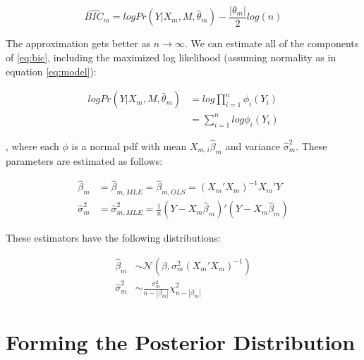 \documentclass{article}
\begin{document}
	\begin{equation} \label{eq:bic}
		\hat{BIC}_m = logPr(Y|X_m,M,\hat{\theta}_m) - \frac{|\theta_m|}{2}log(n)
	\end{equation}

	\noindent The approximation gets better as $n \rightarrow \infty$.  We can estimate all of the
	components of \eqref{eq:bic}, including the maximized log likelihood (assuming normality as 
	in equation \eqref{eq:model}):

	\begin{equation}
		\begin{aligned}
			logPr(Y|X_m,M,\hat{\theta}_m) & = log\prod_{i=1}^n \phi_i(Y_i) \\
			                              & = \sum_{i=1}^n log\phi_i(Y_i)
		\end{aligned}
	\end{equation}

	\noindent, where each $\phi$ is a normal pdf with mean $X_{m,i}\hat{\beta}_m$ and 
	variance $\hat{\sigma}_m^2$. These parameters are estimated as follows:

	\begin{equation}
		\begin{aligned}
			\hat{\beta}_m & = \hat{\beta}_{m,MLE} = \hat{\beta}_{m,OLS} = (X_m'X_m)^{-1}X_m'Y \\
			\hat{\sigma}_m^2 & = \hat{\sigma}_{m,MLE}^2 = \frac{1}{n}(Y - X_m\hat{\beta}_m)'(Y - X_m\hat{\beta}_m)
		\end{aligned}		
	\end{equation}

	\noindent These estimators have the following distributions:
	
	\begin{equation}
		\begin{aligned}
			\hat{\beta}_m & \sim \mathcal{N}(\beta, \sigma_m^2(X_m'X_m)^{-1}) \\
			\hat{\sigma}_m^2 & \sim \frac{\sigma_m^2}{n - |\beta_m|} \chi_{n-|\beta_m|}^2
		\end{aligned}		
	\end{equation}

	\section{Forming the Posterior Distribution}
\end{document}
